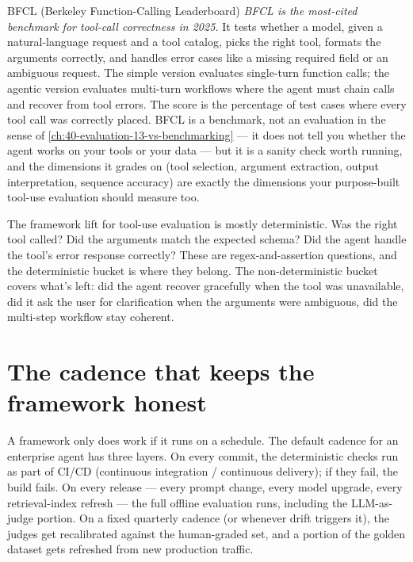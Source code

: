 \begin{TNinpractice}{BFCL (Berkeley Function-Calling Leaderboard)}
\textit{BFCL \citep{bfcl-2024} is the most-cited benchmark for tool-call correctness in 2025.} It tests whether a model, given a natural-language request and a tool catalog, picks the right tool, formats the arguments correctly, and handles error cases like a missing required field or an ambiguous request. The simple version evaluates single-turn function calls; the agentic version evaluates multi-turn workflows where the agent must chain calls and recover from tool errors. The score is the percentage of test cases where every tool call was correctly placed. BFCL is a benchmark, not an evaluation in the sense of \autoref{ch:40-evaluation-13-vs-benchmarking} --- it does not tell you whether the agent works on your tools or your data --- but it is a sanity check worth running, and the dimensions it grades on (tool selection, argument extraction, output interpretation, sequence accuracy) are exactly the dimensions your purpose-built tool-use evaluation should measure too.
\end{TNinpractice}

The framework lift for tool-use evaluation is mostly deterministic. Was the right tool called? Did the arguments match the expected schema? Did the agent handle the tool's error response correctly? These are regex-and-assertion questions, and the deterministic bucket is where they belong. The non-deterministic bucket covers what's left: did the agent recover gracefully when the tool was unavailable, did it ask the user for clarification when the arguments were ambiguous, did the multi-step workflow stay coherent.

\section{The cadence that keeps the framework honest}

A framework only does work if it runs on a schedule. The default cadence for an enterprise agent has three layers. On every commit, the deterministic checks run as part of CI/CD (continuous integration / continuous delivery); if they fail, the build fails. On every release --- every prompt change, every model upgrade, every retrieval-index refresh --- the full offline evaluation runs, including the LLM-as-judge portion. On a fixed quarterly cadence (or whenever drift triggers it), the judges get recalibrated against the human-graded set, and a portion of the golden dataset gets refreshed from new production traffic.

